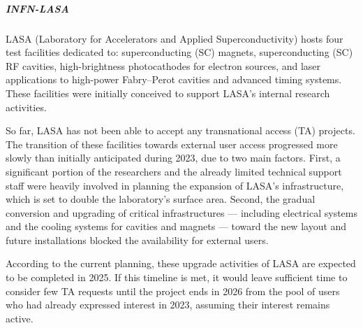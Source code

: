 
\subparagraph{INFN-LASA} 

LASA (Laboratory for Accelerators and Applied Superconductivity) hosts four test facilities dedicated to: superconducting (SC) magnets, superconducting (SC) RF cavities, high-brightness photocathodes for electron sources, and laser applications to high-power Fabry–Perot cavities and advanced timing systems. These facilities were initially conceived to support LASA’s internal research activities.

So far, LASA has not been able to accept any transnational access (TA) projects. The transition of these facilities towards external user access progressed more slowly than initially anticipated during 2023, due to two main factors. First, a significant portion of the researchers and the already limited technical support staff were heavily involved in planning the expansion of LASA’s infrastructure, which is set to double the laboratory’s surface area. Second, the gradual conversion and upgrading of critical infrastructures — including electrical systems and the cooling systems for cavities and magnets — toward the new layout and future installations blocked the availability for external users.

According to the current planning, these upgrade activities of LASA are expected to be completed in 2025. If this timeline is met, it would leave sufficient time to consider few TA requests until the project ends in 2026 from the pool of users who had already expressed interest in 2023, assuming their interest remains active.



